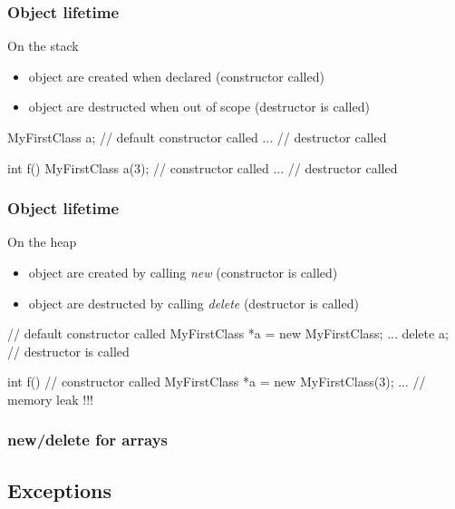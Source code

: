 \begin{frame}[fragile]
  \frametitle{Object lifetime}
  \begin{block}{On the stack}
    \begin{itemize}
    \item object are created when declared (constructor called)
    \item object are destructed when out of scope (destructor is called)
    \end{itemize}
  \end{block}
  \begin{cppcode*}{}
    {
      MyFirstClass a; // default constructor called
      ...
    }  // destructor called

    int f() {
      MyFirstClass a(3); // constructor called
      ...
    } // destructor called
  \end{cppcode*}
\end{frame}

\begin{frame}[fragile]
  \frametitle{Object lifetime}
  \begin{block}{On the heap}
    \begin{itemize}
    \item object are created by calling {\it new} (constructor is called)
    \item object are destructed by calling {\it delete} (destructor is called)
    \end{itemize}
  \end{block}
  \begin{cppcode*}{}
    {
      // default constructor called
      MyFirstClass *a = new MyFirstClass;
      ...
      delete a; // destructor is called
    }

    int f() {
      // constructor called
      MyFirstClass *a = new MyFirstClass(3);
      ...
    } // memory leak !!!
  \end{cppcode*}
\end{frame}

\begin{frame}
  \frametitle{new/delete for arrays}
  \xxx
\end{frame}

\subsection{Exceptions}

